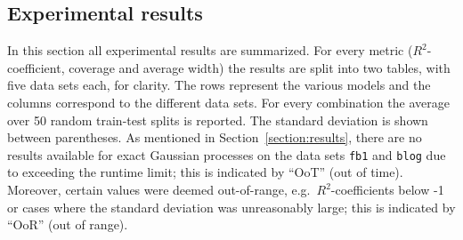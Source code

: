\documentclass[smallcondensed]{svjour3}
\begin{document}
\begin{appendices}
\section{Experimental results}\label{section:app1}

    In this section all experimental results are summarized. For every metric ($R^2$-coefficient, coverage and average width) the results are split into two tables, with five data sets each, for clarity. The rows represent the various models and the columns correspond to the different data sets. For every combination the average over 50 random train-test splits is reported. The standard deviation is shown between parentheses. As mentioned in Section~\ref{section:results}, there are no results available for exact Gaussian processes on the data sets \texttt{fb1} and \texttt{blog} due to exceeding the runtime limit; this is indicated by ``OoT'' (out of time). Moreover, certain values were deemed out-of-range, e.g.\ $R^2$-coefficients below -1 or cases where the standard deviation was unreasonably large; this is indicated by ``OoR'' (out of range).


\end{appendices}
\end{document}
